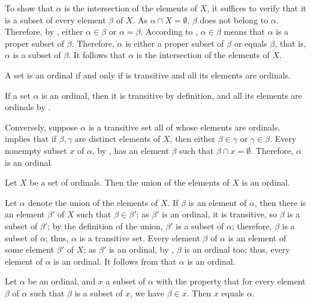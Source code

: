 \documentclass{article}
\begin{document}
To show that \(\alpha\) is the intersection of the elements of \(X\),
it suffices to verify that it is a subset of every element \(\beta\)
of \(X\).  As \(\alpha \cap X = \emptyset\), \(\beta\) does not belong
to \(\alpha\).  Therefore, by , either
\(\alpha \in \beta\) or \(\alpha = \beta\).  According to
, \(\alpha \in \beta\) means that \(\alpha\) is a
proper subset of \(\beta\).  Therefore, \(\alpha\) is either a proper
subset of \(\beta\) or equals \(\beta\), that is, \(\alpha\) is a
subset of \(\beta\).  It follows that \(\alpha\) is the intersection
of the elements of \(X\).

\begin{theorem}
  \label{thm:22wi7nhu}
  A set is an ordinal if and only if is transitive and all its
  elements are ordinals.
\end{theorem}

If a set \(\alpha\) is an ordinal, then it is transitive by
definition, and all its elements are ordinals by .

Conversely, suppose \(\alpha\) is a transitive set all of whose
elements are ordinals.   implies that if
\(\beta, \gamma\) are distinct elements of \(X\), then either
\(\beta \in \gamma\) or \(\gamma \in \beta\).  Every nonempty subset
\(x\) of \(\alpha\), by , has an element \(\beta\)
such that \(\beta \cap x = \emptyset\).  Therefore, \(\alpha\) is an
ordinal.

\begin{theorem}
  \label{thm:9s24zgf9}
  Let \(X\) be a set of ordinals.  Then the union of the elements of
  \(X\) is an ordinal.
\end{theorem}

Let \(\alpha\) denote the union of the elements of \(X\).  If
\(\beta\) is an element of \(\alpha\), then there is an element
\(\beta'\) of \(X\) such that \(\beta \in \beta'\); as \(\beta'\) is
an ordinal, it is transitive, so \(\beta\) is a subset of \(\beta'\);
by the definition of the union, \(\beta'\) is a subset of \(\alpha\);
therefore, \(\beta\) is a subset of \(\alpha\); thus, \(\alpha\) is a
transitive set.  Every element \(\beta\) of \(\alpha\) is an element
of some element \(\beta'\) of \(X\); as \(\beta'\) is an ordinal, by
, \(\beta\) is an ordinal too; thus, every element
of \(\alpha\) is an ordinal.  It follows from  that
\(\alpha\) is an ordinal.

\begin{theorem}
  \label{thm:6ehprsvw}
  Let \(\alpha\) be an ordinal, and \(x\) a subset of \(\alpha\) with
  the property that for every element \(\beta\) of \(\alpha\) such
  that \(\beta\) is a subset of \(x\), we have \(\beta \in x\).  Then
  \(x\) equals \(\alpha\).
\end{theorem}
\end{document}
